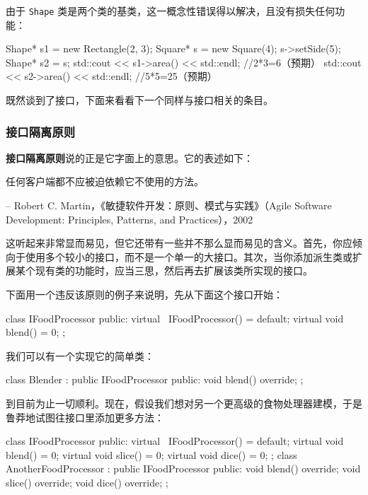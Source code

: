 由于 \texttt{Shape} 类是两个类的基类，这一概念性错误得以解决，且没有损失任何功能：

\begin{codebox}[cpp]
Shape* s1 = new Rectangle(2, 3);
Square* s = new Square(4);
s->setSide(5);
Shape* s2 = s;
std::cout << s1->area() << std::endl;  //2*3=6（预期）
std::cout << s2->area() << std::endl;  //5*5=25（预期）
\end{codebox}

\label{idx:048}
\label{idx:049}
既然谈到了接口，下面来看看下一个同样与接口相关的条目。

\subsubsection{接口隔离原则}

\label{idx:050}
\label{idx:051}
\textbf{接口隔离原则}说的正是它字面上的意思。它的表述如下：

\begin{myQuote}
任何客户端都不应被迫依赖它不使用的方法。

– Robert C. Martin，《敏捷软件开发：原则、模式与实践》（Agile Software Development: Principles, Patterns, and Practices），2002

\end{myQuote}

这听起来非常显而易见，但它还带有一些并不那么显而易见的含义。首先，你应倾向于使用多个较小的接口，而不是一个单一的大接口。其次，当你添加派生类或扩展某个现有类的功能时，应当三思，然后再去扩展该类所实现的接口。

下面用一个违反该原则的例子来说明，先从下面这个接口开始：

\begin{codebox}[cpp]
class IFoodProcessor {
public:
    virtual ~IFoodProcessor() = default;
    virtual void blend() = 0;
};
\end{codebox}

我们可以有一个实现它的简单类：

\begin{codebox}[cpp]
class Blender : public IFoodProcessor {
public:
    void blend() override;
};
\end{codebox}

到目前为止一切顺利。现在，假设我们想对另一个更高级的食物处理器建模，于是鲁莽地试图往接口里添加更多方法：

\begin{codebox}[cpp]
class IFoodProcessor {
public:
    virtual ~IFoodProcessor() = default;
    virtual void blend() = 0;
    virtual void slice() = 0;
    virtual void dice() = 0;
};
class AnotherFoodProcessor : public IFoodProcessor {
public:
    void blend() override;
    void slice() override;
    void dice() override;
};
\end{codebox}

